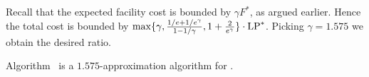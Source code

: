 Recall that the expected facility cost is bounded by $\gamma F^\ast$,
as argued earlier. Hence the total cost is bounded by $\max\{\gamma,
\frac{1/e+1/e^\gamma}{1-1/\gamma}, 1+\frac{2}{e^\gamma}\}\cdot
\mbox{\rm LP}^\ast$. Picking $\gamma=1.575$ we obtain the desired ratio.


\begin{theorem}\label{thm:ebgs}
  Algorithm~{\EBGS} is a $1.575$-approximation algorithm for \FTFP.
\end{theorem}



